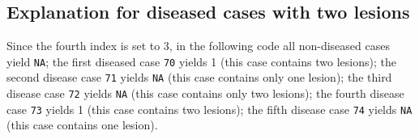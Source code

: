\documentclass[
]{book}
\newenvironment{Shaded}{\begin{snugshade}}{\end{snugshade}}
\newcommand{\CommentTok}[1]{\textcolor[rgb]{0.56,0.35,0.01}{\textit{#1}}}
\newcommand{\DecValTok}[1]{\textcolor[rgb]{0.00,0.00,0.81}{#1}}
\newcommand{\KeywordTok}[1]{\textcolor[rgb]{0.13,0.29,0.53}{\textbf{#1}}}
\newcommand{\NormalTok}[1]{#1}
\newcommand{\OperatorTok}[1]{\textcolor[rgb]{0.81,0.36,0.00}{\textbf{#1}}}
\newcommand{\StringTok}[1]{\textcolor[rgb]{0.31,0.60,0.02}{#1}}
\begin{document}
\begin{Shaded}
\end{Shaded}

\hypertarget{explanation-for-diseased-cases-with-two-lesions}{%
\subsection{Explanation for diseased cases with two lesions}\label{explanation-for-diseased-cases-with-two-lesions}}

Since the fourth index is set to 3, in the following code all non-diseased cases yield \texttt{NA}; the first diseased case \texttt{70} yields 1 (this case contains two lesions); the second disease case \texttt{71} yields \texttt{NA} (this case contains only one lesion); the third disease case \texttt{72} yields \texttt{NA} (this case contains only two lesions); the fourth disease case \texttt{73} yields 1 (this case contains two lesions); the fifth disease case \texttt{74} yields \texttt{NA} (this case contains one lesion).
\end{document}
